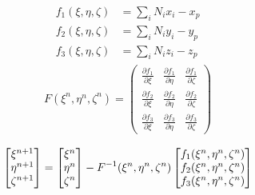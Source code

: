 \documentclass[11pt]{article}
\def\ddp#1_#2{\frac{\partial #1}{\partial #2}}
\begin{document}
\begin{enumerate}
\begin{align*}
f_1(\xi, \eta, \zeta) &= \sum_i N_i x_i - x_p \\
f_2(\xi, \eta, \zeta) &= \sum_i N_i y_i - y_p \\
f_3(\xi, \eta, \zeta) &= \sum_i N_i z_i - z_p
\end{align*}
\begin{align*}
F(\xi^n,\eta^n, \zeta^n) =
\begin{pmatrix}
\ddp{f_1}_{\xi} & \ddp{f_1}_{\eta}  &  \ddp{f_1}_{\zeta}\\
\ddp{f_2}_{\xi} & \ddp{f_2}_{\eta}  &  \ddp{f_2}_{\zeta}\\
\ddp{f_3}_{\xi} & \ddp{f_3}_{\eta}  &  \ddp{f_3}_{\zeta}
\end{pmatrix}\\
\end{align*}
\begin{align*}
\left[
\begin{array}{@{}c@{}}
\xi^{n+1} \\
\eta^{n+1} \\
\zeta^{n+1} \\
\end{array}
\right] =
\left[
\begin{array}{@{}c@{}}
\xi^{n} \\
\eta^{n} \\
\zeta^{n} \\
\end{array}
\right] - F^{-1}(\xi^n,\eta^n, \zeta^n)
\left[
\begin{array}{@{}c@{}}
f_1(\xi^n,\eta^n, \zeta^n )\\
f_2(\xi^n,\eta^n, \zeta^n ) \\
f_3(\xi^n,\eta^n, \zeta^n ) \\
\end{array}
\right]
\end{align*}

\end{enumerate}

\clearpage

\end{document}
